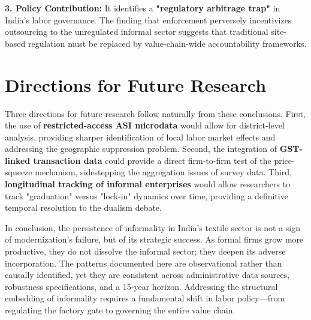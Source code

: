 \textbf{3. Policy Contribution:} It identifies a \textbf{"regulatory arbitrage trap"} in India's labor governance. The finding that enforcement perversely incentivizes outsourcing to the unregulated informal sector suggests that traditional site-based regulation must be replaced by value-chain-wide accountability frameworks.

\section{Directions for Future Research}
\label{sec:future_directions}

Three directions for future research follow naturally from these conclusions. First, the use of \textbf{restricted-access ASI microdata} would allow for district-level analysis, providing sharper identification of local labor market effects and addressing the geographic suppression problem. Second, the integration of \textbf{GST-linked transaction data} could provide a direct firm-to-firm test of the price-squeeze mechanism, sidestepping the aggregation issues of survey data. Third, \textbf{longitudinal tracking of informal enterprises} would allow researchers to track "graduation" versus "lock-in" dynamics over time, providing a definitive temporal resolution to the dualism debate.

In conclusion, the persistence of informality in India's textile sector is not a sign of modernization's failure, but of its strategic success. As formal firms grow more productive, they do not dissolve the informal sector; they deepen its adverse incorporation. The patterns documented here are observational rather than causally identified, yet they are consistent across administrative data sources, robustness specifications, and a 15-year horizon. Addressing the structural embedding of informality requires a fundamental shift in labor policy—from regulating the factory gate to governing the entire value chain.

